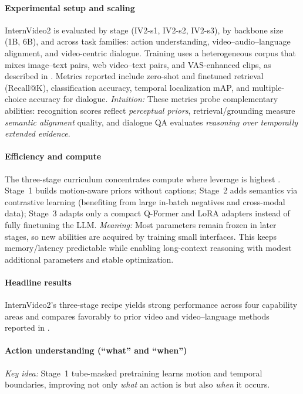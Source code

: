 \begin{enrichment}
\begin{enrichment}
        \paragraph{Experimental setup and scaling}
        InternVideo2 is evaluated by stage (IV2-s1, IV2-s2, IV2-s3), by backbone size (1B, 6B), and across task families: action understanding, video–audio–language alignment, and video-centric dialogue. Training uses a heterogeneous corpus that mixes image–text pairs, web video–text pairs, and VAS-enhanced clips, as described in \cite{wang2024_internvideo2}. Metrics reported include zero-shot and finetuned retrieval (Recall@K), classification accuracy, temporal localization mAP, and multiple-choice accuracy for dialogue. \emph{Intuition:} These metrics probe complementary abilities: recognition scores reflect \emph{perceptual priors}, retrieval/grounding measure \emph{semantic alignment} quality, and dialogue QA evaluates \emph{reasoning over temporally extended evidence}.
        
        \paragraph{Efficiency and compute}
        The three-stage curriculum concentrates compute where leverage is highest \cite{wang2024_internvideo2}. Stage~1 builds motion-aware priors without captions; Stage~2 adds semantics via contrastive learning (benefiting from large in-batch negatives and cross-modal data); Stage~3 adapts only a compact Q-Former and LoRA adapters \cite{hu2021_lora} instead of fully finetuning the LLM. \emph{Meaning:} Most parameters remain frozen in later stages, so new abilities are acquired by training small interfaces. This keeps memory/latency predictable while enabling long-context reasoning with modest additional parameters and stable optimization.
        
        \paragraph{Headline results}
        InternVideo2’s three-stage recipe yields strong performance across four capability areas and compares favorably to prior video and video–language methods reported in \cite{wang2024_internvideo2}.
        
        \paragraph{Action understanding (``what'' and ``when'')}
        \emph{Key idea:} Stage~1 tube-masked pretraining learns motion and temporal boundaries, improving not only \emph{what} an action is but also \emph{when} it occurs.
        

\end{enrichment}
\end{enrichment}
